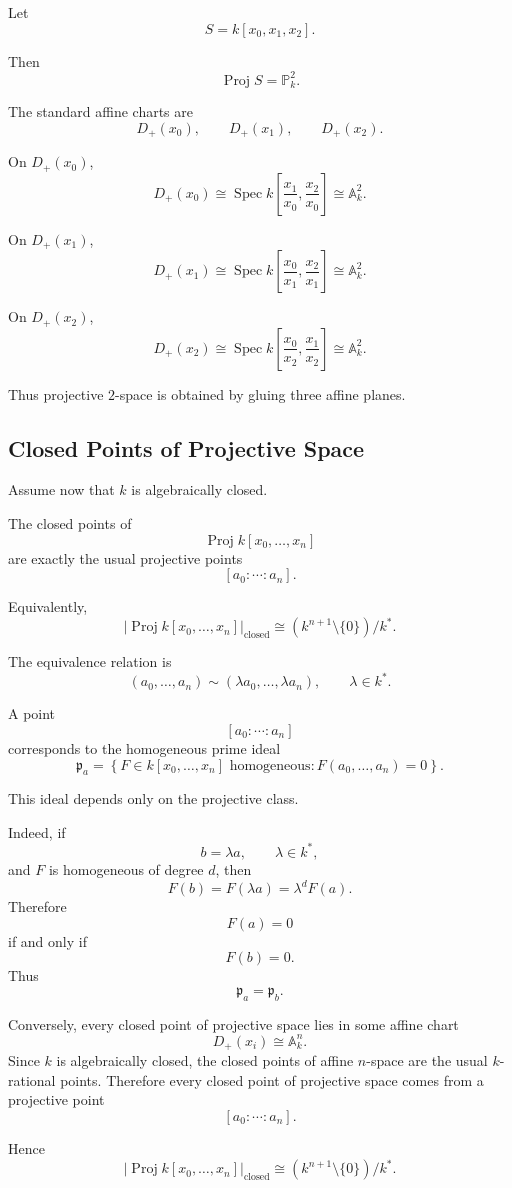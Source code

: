 \documentclass[12pt,a4paper]{article}
\DeclareMathOperator{\Spec}{Spec}
\DeclareMathOperator{\Proj}{Proj}
\theoremstyle{notespace}
\begin{document}
Let
\[
S=k[x_0,x_1,x_2].
\]

Then
\[
\Proj S=\mathbb P_k^2.
\]

The standard affine charts are
\[
D_+(x_0),
\qquad
D_+(x_1),
\qquad
D_+(x_2).
\]

On \(D_+(x_0)\),
\[
D_+(x_0)
\cong
\Spec k\left[
\frac{x_1}{x_0},
\frac{x_2}{x_0}
\right]
\cong
\mathbb A_k^2.
\]

On \(D_+(x_1)\),
\[
D_+(x_1)
\cong
\Spec k\left[
\frac{x_0}{x_1},
\frac{x_2}{x_1}
\right]
\cong
\mathbb A_k^2.
\]

On \(D_+(x_2)\),
\[
D_+(x_2)
\cong
\Spec k\left[
\frac{x_0}{x_2},
\frac{x_1}{x_2}
\right]
\cong
\mathbb A_k^2.
\]

Thus projective \(2\)-space is obtained by gluing three affine planes.

\subsection{Closed Points of Projective Space}

Assume now that \(k\) is algebraically closed.

The closed points of
\[
\Proj k[x_0,\dots,x_n]
\]
are exactly the usual projective points
\[
[a_0:\cdots:a_n].
\]

Equivalently,
\[
\left|\Proj k[x_0,\dots,x_n]\right|_{\mathrm{closed}}
\cong
(k^{n+1}\setminus\{0\})/k^*.
\]

The equivalence relation is
\[
(a_0,\dots,a_n)\sim(\lambda a_0,\dots,\lambda a_n),
\qquad
\lambda\in k^*.
\]

A point
\[
[a_0:\cdots:a_n]
\]
corresponds to the homogeneous prime ideal
\[
\mathfrak p_a
=
\left\{
F\in k[x_0,\dots,x_n]\text{ homogeneous}:
F(a_0,\dots,a_n)=0
\right\}.
\]

This ideal depends only on the projective class.

Indeed, if
\[
b=\lambda a,
\qquad \lambda\in k^*,
\]
and \(F\) is homogeneous of degree \(d\), then
\[
F(b)=F(\lambda a)=\lambda^dF(a).
\]
Therefore
\[
F(a)=0
\]
if and only if
\[
F(b)=0.
\]
Thus
\[
\mathfrak p_a=\mathfrak p_b.
\]

Conversely, every closed point of projective space lies in some affine chart
\[
D_+(x_i)\cong\mathbb A_k^n.
\]
Since \(k\) is algebraically closed, the closed points of affine \(n\)-space are the
usual \(k\)-rational points. Therefore every closed point of projective space comes from
a projective point
\[
[a_0:\cdots:a_n].
\]

Hence
\[
\boxed{
	\left|\Proj k[x_0,\dots,x_n]\right|_{\mathrm{closed}}
	\cong
	(k^{n+1}\setminus\{0\})/k^*.
}
\]
\end{document}
